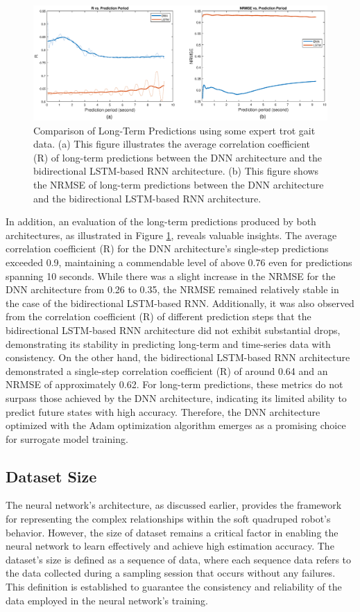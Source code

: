 \begin{figure}[htb]
    \centering
    \includegraphics[width=\linewidth]{img/chap4/long2net.eps}
    \caption{Comparison of Long-Term Predictions using some expert trot gait data. (a) This figure illustrates the average correlation coefficient (R) of long-term predictions between the DNN architecture and the bidirectional LSTM-based RNN architecture. (b) This figure shows the \ac{NRMSE} of long-term predictions between the DNN architecture and the bidirectional LSTM-based RNN architecture.}
    \label{fig:comp2net}
\end{figure}

In addition, an evaluation of the long-term predictions produced by both architectures, as illustrated in Figure \ref{fig:comp2net}, reveals valuable insights. The average correlation coefficient (R) for the DNN architecture's single-step predictions exceeded 0.9, maintaining a commendable level of above 0.76 even for predictions spanning 10 seconds. While there was a slight increase in the \ac{NRMSE} for the DNN architecture from 0.26 to 0.35, the \ac{NRMSE} remained relatively stable in the case of the bidirectional LSTM-based RNN. Additionally, it was also observed from the correlation coefficient (R) of different prediction steps that the bidirectional LSTM-based RNN architecture did not exhibit substantial drops, demonstrating its stability in predicting long-term and time-series data with consistency. On the other hand, the bidirectional LSTM-based RNN architecture demonstrated a single-step correlation coefficient (R) of around 0.64 and an \ac{NRMSE} of approximately 0.62. For long-term predictions, these metrics do not surpass those achieved by the DNN architecture, indicating its limited ability to predict future states with high accuracy. Therefore, the DNN architecture optimized with the Adam optimization algorithm emerges as a promising choice for surrogate model training.

\subsection{Dataset Size}
The neural network's architecture, as discussed earlier, provides the framework for representing the complex relationships within the soft quadruped robot's behavior. However, the size of dataset remains a critical factor in enabling the neural network to learn effectively and achieve high estimation accuracy. The dataset's size is defined as a sequence of data, where each sequence data refers to the data collected during a sampling session that occurs without any failures. This definition is established to guarantee the consistency and reliability of the data employed in the neural network's training.

